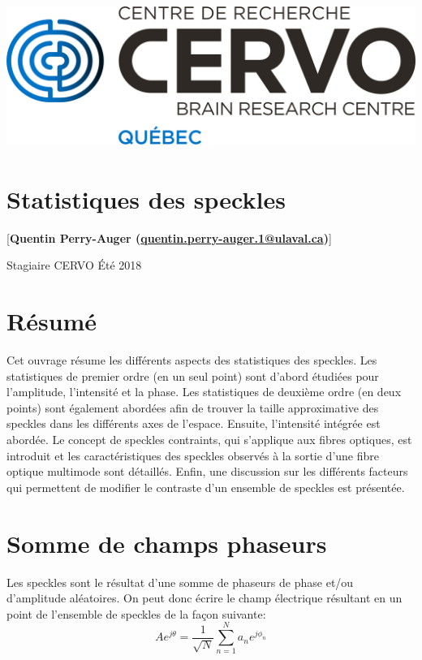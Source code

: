 \documentclass[]{article}
\date{}
\begin{document}
\section{\texorpdfstring{\protect\includegraphics{fig/logo.png}}{image}}\label{image}

\section{Statistiques des speckles}\label{statistiques-des-speckles}

{[}\textbf{Quentin Perry-Auger
(\url{quentin.perry-auger.1@ulaval.ca})}{]}

Stagiaire CERVO Été 2018

\section{\texorpdfstring{\textbf{Résumé}}{Résumé}}\label{ruxe9sumuxe9}

Cet ouvrage résume les différents aspects des statistiques des speckles.
Les statistiques de premier ordre (en un seul point) sont d'abord
étudiées pour l'amplitude, l'intensité et la phase. Les statistiques de
deuxième ordre (en deux points) sont également abordées afin de trouver
la taille approximative des speckles dans les différents axes de
l'espace. Ensuite, l'intensité intégrée est abordée. Le concept de
speckles contraints, qui s'applique aux fibres optiques, est introduit
et les caractéristiques des speckles observés à la sortie d'une fibre
optique multimode sont détaillés. Enfin, une discussion sur les
différents facteurs qui permettent de modifier le contraste d'un
ensemble de speckles est présentée.

\section{Somme de champs phaseurs}\label{somme-de-champs-phaseurs}

Les speckles sont le résultat d'une somme de phaseurs de phase et/ou
d'amplitude aléatoires. On peut donc écrire le champ électrique
résultant en un point de l'ensemble de speckles de la façon suivante: \[
A e^{j\theta} = \frac{1}{\sqrt{N}}\sum_{n=1}^{N}a_{n}e^{j\phi_{n}} \label{eq1}
\]
\end{document}
